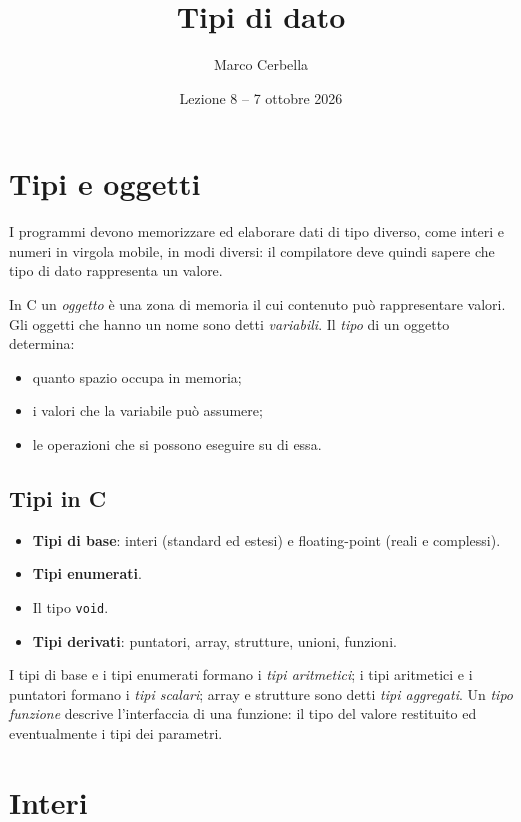 \documentclass[11pt,a4paper]{article}
\title{Tipi di dato}
\author{Marco Cerbella}
\date{Lezione 8 -- 7 ottobre 2026}
\begin{document}
\maketitle

\section{Tipi e oggetti}

I programmi devono memorizzare ed elaborare dati di tipo diverso, come interi e
numeri in virgola mobile, in modi diversi: il compilatore deve quindi sapere che
tipo di dato rappresenta un valore.

\begin{definizione}
In C un \emph{oggetto} è una zona di memoria il cui contenuto può rappresentare
valori. Gli oggetti che hanno un nome sono detti \emph{variabili}. Il
\emph{tipo} di un oggetto determina:
\begin{itemize}
    \item quanto spazio occupa in memoria;
    \item i valori che la variabile può assumere;
    \item le operazioni che si possono eseguire su di essa.
\end{itemize}
\end{definizione}

\subsection{Tipi in C}

\begin{itemize}
    \item \textbf{Tipi di base}: interi (standard ed estesi) e floating-point
          (reali e complessi).
    \item \textbf{Tipi enumerati}.
    \item Il tipo \lstinline|void|.
    \item \textbf{Tipi derivati}: puntatori, array, strutture, unioni, funzioni.
\end{itemize}

I tipi di base e i tipi enumerati formano i \emph{tipi aritmetici}; i tipi
aritmetici e i puntatori formano i \emph{tipi scalari}; array e strutture sono
detti \emph{tipi aggregati}. Un \emph{tipo funzione} descrive l'interfaccia di
una funzione: il tipo del valore restituito ed eventualmente i tipi dei
parametri.

\section{Interi}
\end{document}
